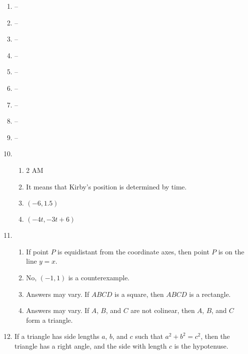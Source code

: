 \documentclass{article}
\begin{document}
\begin{enumerate}
\begin{enumerate}
	\end{enumerate}
	
\item --

\item --

\item --

\item --

\item --

\item --

\item --

\item --

\item --

\item 

	\begin{enumerate}
	
	\item 2 AM
	
	\item It means that Kirby's position is determined by time. 
	
	\item $(-6, 1.5)$
	
	\item $(-4t, -3t + 6)$
	
	\end{enumerate}

\item

	\begin{enumerate}

	\item If point $P$ is equidistant from the coordinate axes, then point $P$ is on the line $y = x$.
	
	\item No, $(-1, 1)$ is a counterexample.
	
	\item Answers may vary. If $ABCD$ is a square, then $ABCD$ is a rectangle.
	
	\item Answers may vary. If $A$, $B$, and $C$ are not colinear, then $A$, $B$, and $C$ form a triangle.
	
	\end{enumerate}
	
\item If a triangle has side lengths $a$, $b$, and $c$ such that $a^2 + b^2 = c^2$, then the triangle has a right angle, and the side with length $c$ is the hypotenuse.


\end{enumerate}
\end{document}
